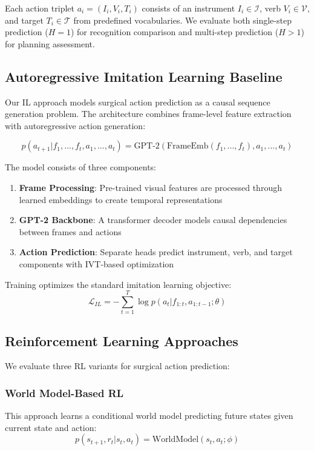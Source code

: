 \documentclass[runningheads]{llncs}
\begin{document}
Each action triplet $a_i = (I_i, V_i, T_i)$ consists of an instrument $I_i \in \mathcal{I}$, verb $V_i \in \mathcal{V}$, and target $T_i \in \mathcal{T}$ from predefined vocabularies. We evaluate both single-step prediction ($H=1$) for recognition comparison and multi-step prediction ($H>1$) for planning assessment.

\subsection{Autoregressive Imitation Learning Baseline}

Our IL approach models surgical action prediction as a causal sequence generation problem. The architecture combines frame-level feature extraction with autoregressive action generation:

\begin{equation}
p(a_{t+1}|f_1, ..., f_t, a_1, ..., a_t) = \text{GPT-2}(\text{FrameEmb}(f_1, ..., f_t), a_1, ..., a_t)
\end{equation}

The model consists of three components:
\begin{enumerate}
\item \textbf{Frame Processing}: Pre-trained visual features are processed through learned embeddings to create temporal representations
\item \textbf{GPT-2 Backbone}: A transformer decoder models causal dependencies between frames and actions
\item \textbf{Action Prediction}: Separate heads predict instrument, verb, and target components with IVT-based optimization
\end{enumerate}

Training optimizes the standard imitation learning objective:
\begin{equation}
\mathcal{L}_{IL} = -\sum_{t=1}^{T} \log p(a_t|f_{1:t}, a_{1:t-1}; \theta)
\end{equation}

\subsection{Reinforcement Learning Approaches}

We evaluate three RL variants for surgical action prediction:

\subsubsection{World Model-Based RL}
This approach learns a conditional world model predicting future states given current state and action:
\begin{equation}
p(s_{t+1}, r_t|s_t, a_t) = \text{WorldModel}(s_t, a_t; \phi)
\end{equation}
\end{document}
